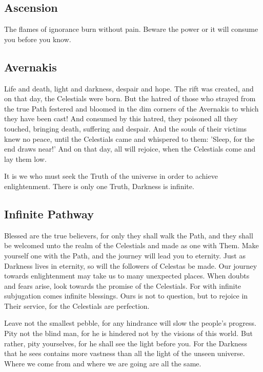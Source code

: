 \subsection{Ascension}

The flames of ignorance burn without pain. Beware the power or it will consume you before you know.

\subsection{Avernakis}

Life and death, light and darkness, despair and hope. The rift was created, and on that day, the Celestials were born. But the hatred of those who strayed from the true Path festered and bloomed in the dim corners of the Avernakis to which they have been cast! And consumed by this hatred, they poisoned all they touched, bringing death, suffering and despair. And the souls of their victims knew no peace, until the Celestials came and whispered to them: 'Sleep, for the end draws near!' And on that day, all will rejoice, when the Celestials come and lay them low. 

It is we who must seek the Truth of the universe in order to achieve enlightenment. There is only one Truth, Darkness is infinite.

\subsection{Infinite Pathway}

Blessed are the true believers, for only they shall walk the Path, and they shall be welcomed unto the realm of the Celestials and made as one with Them. Make yourself one with the Path, and the journey will lead you to eternity. Just as Darkness lives in eternity, so will the followers of Celestas be made.
Our journey towards enlightenment may take us to many unexpected places. When doubts and fears arise, look towards the promise of the Celestials. For with infinite subjugation comes infinite blessings. Ours is not to question, but to rejoice in Their service, for the Celestials are perfection. 

Leave not the smallest pebble, for any hindrance will slow the people's progress.  Pity not the blind man, for he is hindered not by the visions of this world. But rather, pity yourselves, for he shall see the light before you. For the Darkness that he sees contains more vastness than all the light of the unseen universe. Where we come from and where we are going are all the same. 

